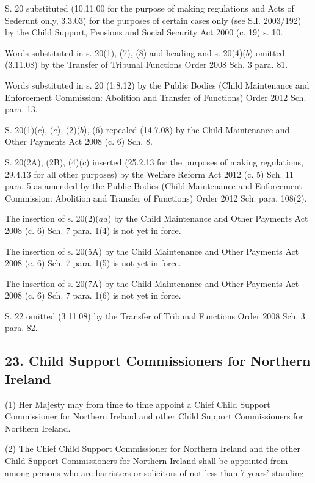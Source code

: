 \documentclass[12pt,a4paper]{article}
\begin{document}
{{%

S. 20 substituted (10.11.00 for the purpose of making regulations and Acts of Sederunt only, 3.3.03) for the purposes of certain cases only (see S.I. 2003/192) by the Child Support, Pensions and Social Security Act 2000 (c. 19) s. 10. 

Words substituted in s. 20(1), (7), (8) and heading and s. 20(4)($b$) omitted (3.11.08) by the Transfer of Tribunal Functions Order 2008 Sch. 3 para. 81. 

Words substituted in s. 20 (1.8.12) by the Public Bodies (Child Maintenance and Enforcement Commission: Abolition and Transfer of Functions) Order 2012 Sch. para.
13.

S. 20(1)($c$), ($e$), (2)($b$), (6) repealed (14.7.08) by the Child Maintenance and Other Payments
Act 2008 (c. 6) Sch. 8. 

S. 20(2A), (2B), (4)($c$) inserted (25.2.13 for the purposes of making regulations, 29.4.13 for all other purposes) by the Welfare Reform Act 2012 (c. 5) Sch. 11 para. 5 as amended by the Public Bodies (Child Maintenance and Enforcement Commission: Abolition and Transfer of Functions) Order 2012 Sch. para. 108(2).

The insertion of s. 20(2)($aa$) by the Child Maintenance and Other Payments Act 2008 (c. 6) Sch. 7 para. 1(4) is not yet in force.

The insertion of s. 20(5A) by the Child Maintenance and Other Payments Act 2008 (c. 6) Sch. 7 para. 1(5) is not yet in force.

The insertion of s. 20(7A) by the Child Maintenance and Other Payments Act 2008 (c. 6) Sch. 7 para. 1(6) is not yet in force.

\medskip

S. 22 omitted (3.11.08) by the Transfer of Tribunal Functions Order 2008 Sch. 3 para. 82.

}
}

\subsection{23. Child Support Commissioners for Northern Ireland}

(1) Her Majesty may from time to time appoint a Chief Child Support Commissioner for Northern Ireland and other Child Support Commissioners for Northern Ireland.

(2)
The Chief Child Support Commissioner for Northern Ireland and the other Child Support Commissioners for Northern Ireland shall be appointed from among persons who are barristers or solicitors of not less than 7 years’ standing.
\end{document}
